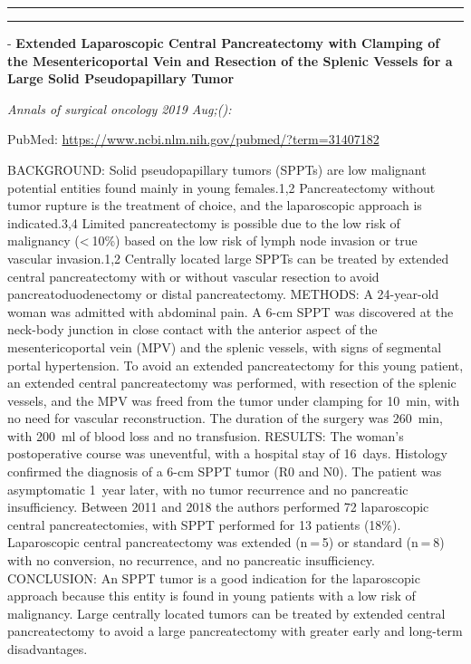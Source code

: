 \documentclass[]{article}
\begin{document}
{}

{}

\begin{center}\rule{0.5\linewidth}{\linethickness}\end{center}

\begin{center}\rule{0.5\linewidth}{\linethickness}\end{center}

 - \textbf{Extended Laparoscopic Central Pancreatectomy with Clamping of
the Mesentericoportal Vein and Resection of the Splenic Vessels for a
Large Solid Pseudopapillary Tumor}

\emph{Annals of surgical oncology 2019 Aug;():}

PubMed: \url{https://www.ncbi.nlm.nih.gov/pubmed/?term=31407182}

BACKGROUND: Solid pseudopapillary tumors (SPPTs) are low malignant
potential entities found mainly in young females.1,2 Pancreatectomy
without tumor rupture is the treatment of choice, and the laparoscopic
approach is indicated.3,4 Limited pancreatectomy is possible due to the
low risk of malignancy (\textless{} 10\%) based on the low risk of lymph
node invasion or true vascular invasion.1,2 Centrally located large
SPPTs can be treated by extended central pancreatectomy with or without
vascular resection to avoid pancreatoduodenectomy or distal
pancreatectomy. METHODS: A 24-year-old woman was admitted with abdominal
pain. A 6-cm SPPT was discovered at the neck-body junction in close
contact with the anterior aspect of the mesentericoportal vein (MPV) and
the splenic vessels, with signs of segmental portal hypertension. To
avoid an extended pancreatectomy for this young patient, an extended
central pancreatectomy was performed, with resection of the splenic
vessels, and the MPV was freed from the tumor under clamping for 10~min,
with no need for vascular reconstruction. The duration of the surgery
was 260~min, with 200~ml of blood loss and no transfusion. RESULTS: The
woman's postoperative course was uneventful, with a hospital stay of
16~days. Histology confirmed the diagnosis of a 6-cm SPPT tumor (R0 and
N0). The patient was asymptomatic 1~year later, with no tumor recurrence
and no pancreatic insufficiency. Between 2011 and 2018 the authors
performed 72 laparoscopic central pancreatectomies, with SPPT performed
for 13 patients (18\%). Laparoscopic central pancreatectomy was extended
(n = 5) or standard (n = 8) with no conversion, no recurrence, and no
pancreatic insufficiency. CONCLUSION: An SPPT tumor is a good indication
for the laparoscopic approach because this entity is found in young
patients with a low risk of malignancy. Large centrally located tumors
can be treated by extended central pancreatectomy to avoid a large
pancreatectomy with greater early and long-term disadvantages.
\end{document}
